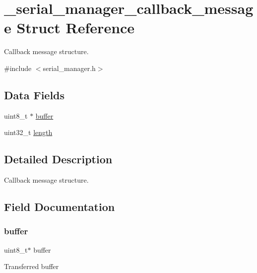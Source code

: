 \hypertarget{struct__serial__manager__callback__message}{}\section{\+\_\+serial\+\_\+manager\+\_\+callback\+\_\+message Struct Reference}
\label{struct__serial__manager__callback__message}


Callback message structure.  




{\ttfamily \#include $<$serial\+\_\+manager.\+h$>$}

\subsection*{Data Fields}
\begin{DoxyCompactItemize}
\item 
uint8\+\_\+t $\ast$ \mbox{\hyperlink{struct__serial__manager__callback__message_a56ed84df35de10bdb65e72b184309497}{buffer}}
\item 
uint32\+\_\+t \mbox{\hyperlink{struct__serial__manager__callback__message_aebb70c2aab3407a9f05334c47131a43b}{length}}
\end{DoxyCompactItemize}


\subsection{Detailed Description}
Callback message structure. 

\subsection{Field Documentation}
\mbox{\label{struct__serial__manager__callback__message_a56ed84df35de10bdb65e72b184309497}} 
\subsubsection{\texorpdfstring{buffer}{buffer}}
{\footnotesize\ttfamily uint8\+\_\+t$\ast$ buffer}

Transferred buffer \mbox{\label{struct__serial__manager__callback__message_aebb70c2aab3407a9f05334c47131a43b}} 
